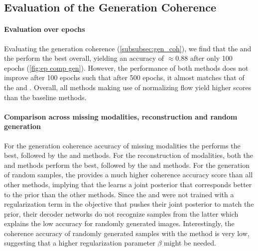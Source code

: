 \subsection{Evaluation of the Generation Coherence}

\paragraph{Evaluation over epochs}
Evaluating the generation coherence (\cref{subsubsec:gen_coh}), we find that the  and the  perform the best overall, yielding an accuracy of $\approx 0.88$ after only 100 epochs (\cref{fig:ep comp gen}).
However, the performance of both methods does not improve after 100 epochs such that after 500 epochs, it almost matches that of the  and .
Overall, all methods making use of normalizing flow yield higher scores than the baseline methods.

\begin{sansmath}
\end{sansmath}

\paragraph{Comparison across missing modalities, reconstruction and random generation}
For the generation coherence accuracy of missing modalities the  performs the best, followed by the  and  methods.
For the reconstruction of modalities, both the  and  methods perform the best, followed by the  and  methods.
For the generation of random samples, the  provides a much higher coherence accuracy score than all other methods, implying that the  learns a joint posterior that corresponds better to the prior than the other methods.
Since the  and  were not trained with a regularization term in the objective that pushes their joint posterior to match the prior, their decoder networks do not recognize samples from the latter which explains the low accuracy for randomly generated images.
Interestingly, the coherence accuracy of randomly generated samples with the  method is very low, suggesting that a higher regularization parameter $\beta$ might be needed.

